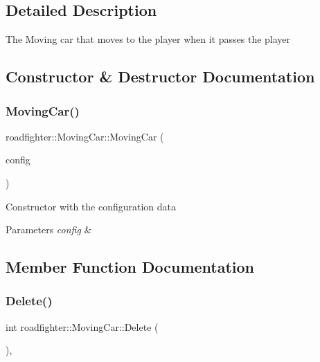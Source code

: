 \subsection{Detailed Description}
The Moving car that moves to the player when it passes the player 

\subsection{Constructor \& Destructor Documentation}
\mbox{\label{classroadfighter_1_1MovingCar_a938e531ba0de68f564f188d55a59e138}} 
\subsubsection{\texorpdfstring{Moving\+Car()}{MovingCar()}}
{\footnotesize\ttfamily roadfighter\+::\+Moving\+Car\+::\+Moving\+Car (\begin{DoxyParamCaption}\item[{std\+::shared\+\_\+ptr$<$ \hyperlink{classConfigData}{Config\+Data} $>$}]{config }\end{DoxyParamCaption})}

Constructor with the configuration data 
\begin{DoxyParams}{Parameters}
{\em config} & \\
\hline
\end{DoxyParams}


\subsection{Member Function Documentation}
\mbox{\label{classroadfighter_1_1MovingCar_a97196aa72de773ac88d1df99c47a5367}} 
\subsubsection{\texorpdfstring{Delete()}{Delete()}}
{\footnotesize\ttfamily int roadfighter\+::\+Moving\+Car\+::\+Delete (\begin{DoxyParamCaption}{ }\end{DoxyParamCaption})\hspace{0.3cm}{\ttfamily [override]}, {\ttfamily [virtual]}}

